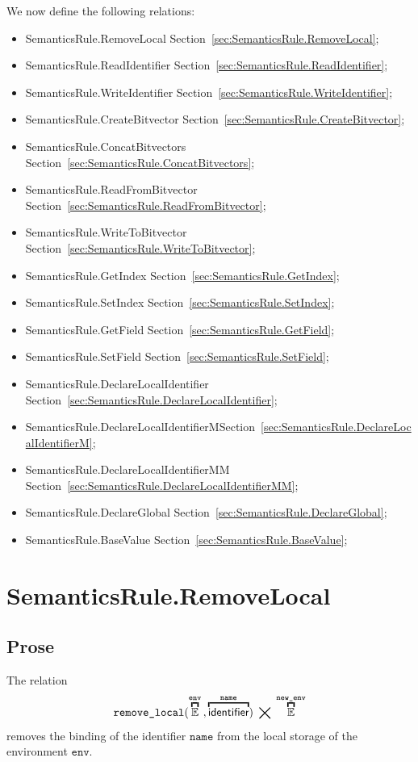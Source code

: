 \documentclass{book}
\newcommand\secref[1]{Section~\ref{sec:#1}}
\newcommand\overname[2]{\overbracket{#1}^{#2}}
\newcommand\aslrel[0]{\bigtimes}
\newcommand\aslsep[0]{\mathbf{,}}
\newcommand\newenv[0]{\texttt{new\_env}}
\newcommand\env[0]{\texttt{env}}
\newcommand\name[0]{\texttt{name}}
\begin{document}
We now define the following relations:
\begin{itemize}
  \item SemanticsRule.RemoveLocal \secref{SemanticsRule.RemoveLocal};
  \item SemanticsRule.ReadIdentifier \secref{SemanticsRule.ReadIdentifier};
  \item SemanticsRule.WriteIdentifier \secref{SemanticsRule.WriteIdentifier};
  \item SemanticsRule.CreateBitvector \secref{SemanticsRule.CreateBitvector};
  \item SemanticsRule.ConcatBitvectors \secref{SemanticsRule.ConcatBitvectors};
  \item SemanticsRule.ReadFromBitvector \secref{SemanticsRule.ReadFromBitvector};
  \item SemanticsRule.WriteToBitvector \secref{SemanticsRule.WriteToBitvector};
  \item SemanticsRule.GetIndex \secref{SemanticsRule.GetIndex};
  \item SemanticsRule.SetIndex \secref{SemanticsRule.SetIndex};
  \item SemanticsRule.GetField \secref{SemanticsRule.GetField};
  \item SemanticsRule.SetField \secref{SemanticsRule.SetField};
  \item SemanticsRule.DeclareLocalIdentifier \secref{SemanticsRule.DeclareLocalIdentifier};
  \item SemanticsRule.DeclareLocalIdentifierM\secref{SemanticsRule.DeclareLocalIdentifierM};
  \item SemanticsRule.DeclareLocalIdentifierMM \secref{SemanticsRule.DeclareLocalIdentifierMM};
  \item SemanticsRule.DeclareGlobal \secref{SemanticsRule.DeclareGlobal};
  \item SemanticsRule.BaseValue \secref{SemanticsRule.BaseValue};
\end{itemize}

\section{SemanticsRule.RemoveLocal \label{sec:SemanticsRule.RemoveLocal}}
\subsection{Prose}
The relation
\[
  \removelocal(\overname{\envs}{\env} \aslsep \overname{\identifier}{\name}) \;\aslrel\; \overname{\envs}{\newenv}
\]
removes the binding of the identifier $\name$ from the local storage of the environment $\env$.
\end{document}
